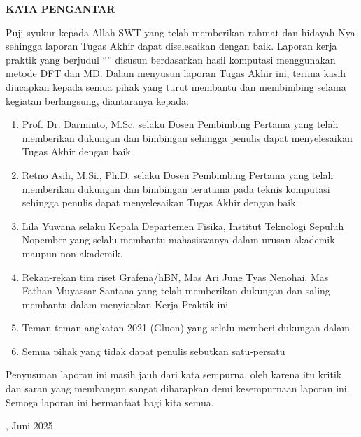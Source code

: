 \pagebreak
\begin{center}
    {\textbf{KATA PENGANTAR}}
    \pagestyle{fancy}
\end{center}

Puji syukur kepada Allah SWT yang telah memberikan rahmat dan hidayah-Nya sehingga laporan Tugas Akhir dapat diselesaikan dengan baik. Laporan kerja praktik yang berjudul “\judulTA” disusun berdasarkan hasil komputasi menggunakan metode DFT dan MD. Dalam menyusun laporan Tugas Akhir ini, terima kasih diucapkan kepada semua pihak yang turut membantu dan membimbing selama kegiatan berlangsung, diantaranya kepada:
\begin{enumerate}
    \item Prof. Dr. Darminto, M.Sc. selaku Dosen Pembimbing Pertama yang telah memberikan dukungan dan bimbingan sehingga penulis dapat menyelesaikan Tugas Akhir dengan baik.
    \item Retno Asih, M.Si., Ph.D. selaku Dosen Pembimbing Pertama yang telah memberikan dukungan dan bimbingan terutama pada teknis komputasi sehingga penulis dapat menyelesaikan Tugas Akhir dengan baik.
    \item Lila Yuwana selaku Kepala Departemen Fisika, Institut Teknologi Sepuluh Nopember yang selalu membantu mahasiswanya dalam urusan akademik maupun non-akademik.
    \item Rekan-rekan tim riset Grafena/hBN, Mas Ari June Tyas Nenohai, Mas Fathan Muyassar Santana yang telah memberikan dukungan dan saling membantu dalam menyiapkan Kerja Praktik ini
    \item Teman-teman angkatan 2021 (Gluon) yang selalu memberi dukungan dalam 
    \item Semua pihak yang tidak dapat penulis sebutkan satu-persatu
\end{enumerate}
Penyusunan laporan ini masih jauh dari kata sempurna, oleh karena itu kritik dan saran yang membangun sangat diharapkan demi kesempurnaan laporan ini. Semoga laporan ini bermanfaat bagi kita semua.
\vspace{6mm}

\begin{flushright}

\namaKota, Juni 2025

\vspace{15mm}

\namaMahasiswa

\end{flushright}

\newpage